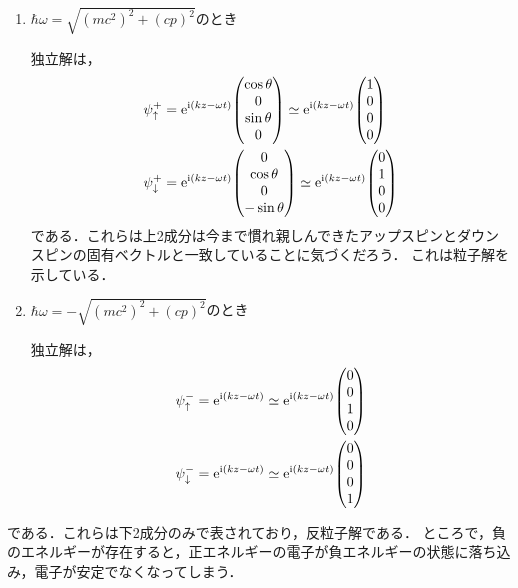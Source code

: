 \documentclass{report}
\begin{document}
    \begin{enumerate}
      \item $\hbar\omega = \sqrt{(mc^2)^2 + (cp)^2}$のとき \par
        独立解は，
        \begin{align}
          \psi_{\uparrow}^{+} &= \e^{\i(kz-\omega t)}\mqty(\cos\theta \\ 0 \\ \sin\theta \\ 0)
          \simeq
          \e^{\i(kz-\omega t)}
          \mqty(1 \\ 0 \\ 0 \\ 0) \label{dirac-plane-particle-up}\\ 
          \psi_{\downarrow}^{+} &= \e^{\i(kz-\omega t)}
          \mqty(0 \\ \cos\theta \\ 0 \\ -\sin\theta)
          \simeq
          \e^{\i(kz-\omega t)}
          \mqty(0 \\ 1 \\ 0 \\ 0)\label{dirac-plane-particle-down}
        \end{align}
        である．これらは上2成分は今まで慣れ親しんできたアップスピンとダウンスピンの固有ベクトルと一致していることに気づくだろう．
        これは粒子解を示している．
      \item $\hbar\omega = -\sqrt{(mc^2)^2 + (cp)^2}$のとき \par
        独立解は，
        \begin{align}
          \psi_{\uparrow}^{-} &= \e^{\i(kz-\omega t)}
          \simeq
          \e^{\i(kz-\omega t)}
          \mqty(0 \\ 0 \\ 1 \\ 0) \label{dirac-plane-antiparticle-up}\\ 
          \psi_{\downarrow}^{-} &= \e^{\i(kz-\omega t)}
          \simeq
          \e^{\i(kz-\omega t)}
          \mqty(0 \\ 0 \\ 0 \\ 1)\label{dirac-plane-antiparticle-down}
        \end{align}
    \end{enumerate}
    である．これらは下2成分のみで表されており，反粒子解である．
    ところで，負のエネルギーが存在すると，正エネルギーの電子が負エネルギーの状態に落ち込み，電子が安定でなくなってしまう．
\end{document}
